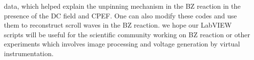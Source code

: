 \documentclass[journal=jacsat,manuscript=article]{achemso}
\begin{document}
data, which helped explain the unpinning mechanism in the BZ reaction
in the presence of the DC field and CPEF. One can also modify these
codes and use them to reconstruct scroll waves in the BZ reaction.
we hope our LabVIEW scripts will be useful for the scientific
community working on BZ reaction or other experiments which involves
image processing and voltage generation by virtual instrumentation.
\begin{acknowledgement}
\end{acknowledgement}

\begin{suppinfo}
\end{suppinfo}


\end{document}
